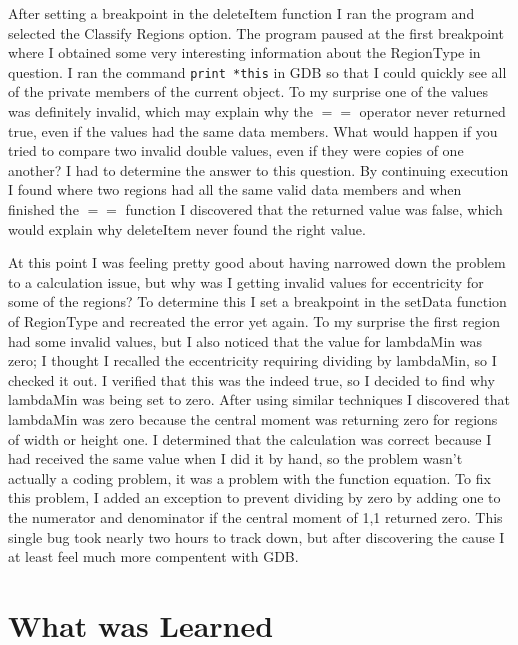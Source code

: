 \documentclass[pdftex, 12pt]{article}
\begin{document}
\begin{description}
		After setting a breakpoint in the deleteItem function I ran the program and selected the Classify Regions option.  The
		program paused at the first breakpoint where I obtained some very interesting information about the RegionType in
		question.  I ran the command \texttt{print *this} in GDB so that I could quickly see all of the private members of the
		current object.  To my surprise one of the values was definitely invalid, which may explain why the $==$ operator never
		returned true, even if the values had the same data members.  What would happen if you tried to compare two invalid double
		values, even if they were copies of one another?  I had to determine the answer to this question.  By continuing execution
		I found where two regions had all the same valid data members and when finished the $==$ function I discovered that the
		returned value was false, which would explain why deleteItem never found the right value.

		At this point I was feeling pretty good about having narrowed down the problem to a calculation issue, but why was I
		getting invalid values for eccentricity for some of the regions?  To determine this I set a breakpoint in the
		setData function of RegionType and recreated the error yet again.  To my surprise the first region had some invalid
		values, but I also noticed that the value for lambdaMin was zero; I thought I recalled the eccentricity requiring
		dividing by lambdaMin, so I checked it out.  I verified that this was the indeed true, so I decided to find why
		lambdaMin was being set to zero.  After using similar techniques I discovered that lambdaMin was zero because the central
		moment was returning zero for regions of width or height one.  I determined that the calculation was correct because I
		had received the same value when I did it by hand, so the problem wasn't actually a coding problem, it was a problem with
		the function equation.  To fix this problem, I added an exception to prevent dividing by zero by adding one to the
		numerator and denominator if the central moment of 1,1 returned zero.  This single bug took nearly two hours to track
		down, but after discovering the cause I at least feel much more compentent with GDB.


		\section{What was Learned}


\end{description}
\end{document}
